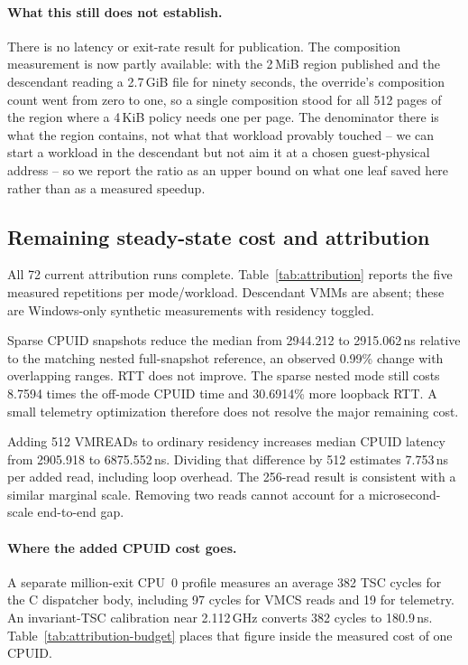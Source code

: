 \paragraph{What this still does not establish.}
There is no latency or exit-rate result for publication. The composition
measurement is now partly available: with the 2\,MiB region published and the
descendant reading a 2.7\,GiB file for ninety seconds, the override's
composition count went from zero to one, so a single composition stood for all
512 pages of the region where a 4\,KiB policy needs one per page. The
denominator there is what the region contains, not what that workload provably
touched -- we can start a workload in the descendant but not aim it at a chosen
guest-physical address -- so we report the ratio as an upper bound on what one
leaf saved here rather than as a measured speedup.

\subsection{Remaining steady-state cost and attribution}
\label{sec:performance}
All 72 current attribution runs complete. Table~\ref{tab:attribution} reports
the five measured repetitions per mode/workload. Descendant VMMs are absent;
these are Windows-only synthetic measurements with residency toggled.

\begin{table}[tbp]
\centering\small
\caption{Current same-binary attribution. Values are median and observed
minimum--maximum over five measured runs. CPUID is leaf~0; RTT is loopback.}
\label{tab:attribution}

\end{table}

Sparse CPUID snapshots reduce the median from 2944.212 to 2915.062\,ns relative
to the matching nested full-snapshot reference, an observed 0.99\% change with
overlapping ranges. RTT does not improve. The sparse nested mode still costs
8.7594 times the off-mode CPUID time and 30.6914\% more loopback RTT. A small
telemetry optimization therefore does not resolve the major remaining cost.

Adding 512 VMREADs to ordinary residency increases median CPUID latency from
2905.918 to 6875.552\,ns. Dividing that difference by 512 estimates 7.753\,ns
per added read, including loop overhead. The 256-read result is consistent with
a similar marginal scale. Removing two reads cannot account for a
microsecond-scale end-to-end gap.

\paragraph{Where the added CPUID cost goes.}
A separate million-exit CPU~0 profile measures an average 382 TSC cycles for the
C dispatcher body, including 97 cycles for VMCS reads and 19 for telemetry. An
invariant-TSC calibration near 2.112\,GHz converts 382 cycles to 180.9\,ns.
Table~\ref{tab:attribution-budget} places that figure inside the measured cost of
one CPUID.

